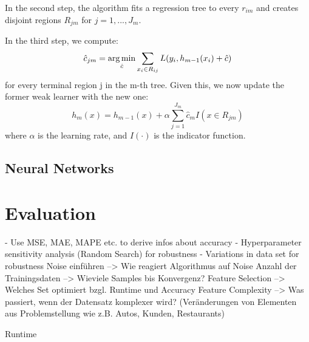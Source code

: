 In the second step, the algorithm fits a regression tree to every $ r_{im} $ and creates disjoint regions $ R_{jm} $ for $j = 1, ..., J_m$. 

In the third step, we compute: 
\begin{equation}
	\hat{c}_{jm} = \operatorname*{arg\,min}_{\hat{c}} \sum_{x_i \in R_{ij}} L(y_i, h_{m-1}(x_i) + \hat{c})
\end{equation}
for every terminal region j in the m-th tree. 
Given this, we now update the former weak learner with the new one:
\begin{equation}
	h_m(x) = h_{m-1}(x) + \alpha \sum_{j=1}^{J_m} \hat{c}_{m}I(x \in R_{jm})
\end{equation}
where $ \alpha $ is the learning rate, and $ I(\cdot) $ is the indicator function.

\subsection{Neural Networks}


\section{Evaluation} 
- Use MSE, MAE, MAPE etc. to derive infos about accuracy
- Hyperparameter sensitivity analysis (Random Search) for robustness
- Variations in data set for robustness
Noise einführen 
--> Wie reagiert Algorithmus auf Noise
Anzahl der Trainingsdaten 
--> Wieviele Samples bis Konvergenz?
Feature Selection
--> Welches Set optimiert bzgl. Runtime und Accuracy
Feature Complexity
--> Was passiert, wenn der Datensatz komplexer wird? (Veränderungen von Elementen aus Problemstellung wie z.B. Autos, Kunden, Restaurants)

Runtime